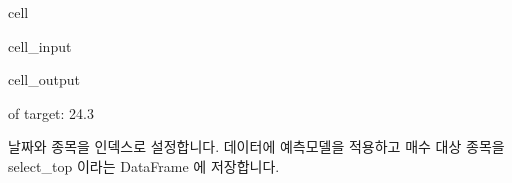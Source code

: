 \documentclass[letterpaper,10pt,english]{jupyterBook}
\begin{document}
\begin{sphinxuseclass}{cell}\begin{sphinxVerbatimInput}

\begin{sphinxuseclass}{cell_input}
\begin{sphinxVerbatim}[commandchars=\\\{\}]
   
\PYG{p}{[}\PYG{p}{]}  \PYG{p}{[}\PYG{p}{]}   
  \PYG{p}{[}\PYG{p}{]}
\end{sphinxVerbatim}

\end{sphinxuseclass}\end{sphinxVerbatimInput}
\begin{sphinxVerbatimOutput}

\begin{sphinxuseclass}{cell_output}
\begin{sphinxVerbatim}[commandchars=\\\{\}]
\PYGZpc{} of target: 24.3\PYGZpc{}
\end{sphinxVerbatim}

\end{sphinxuseclass}\end{sphinxVerbatimOutput}

\end{sphinxuseclass}
\sphinxAtStartPar
 날짜와 종목을 인덱스로 설정합니다. 데이터에 예측모델을 적용하고 매수 대상 종목을 select\_top 이라는 DataFrame 에 저장합니다.
\end{document}

